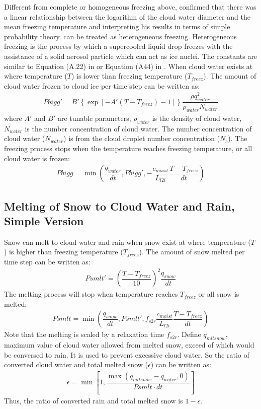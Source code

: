 \documentclass[letterpaper,titlepage,10pt]{article}
\numberwithin{equation}{section}
\begin{document}
Different from complete or homogeneous freezing above, \citet{bigg1953thes} confirmed that there was a linear relationship between the logarithm of the cloud water diameter and the mean freezing temperature and interpreting his results in terms of simple probability theory. \citet{bigg1953thes} can be treated as heterogeneous freezing. Heterogeneous freezing is the process by which a supercooled liquid drop freezes with the assistance of a solid aerosol particle which can act as ice nuclei. The constants are similar to Equation (A.22) in \citet{reisner1998expl} or Equation (A44) in \citet{hong2006thew}. When cloud water exists at where temperature ($T$) is lower than freezing temperature ($T_{freez}$). The amount of cloud water frozen to cloud ice per time step can be written as:
\begin{gather}
	Pbigg' = B' \left\{\exp \left[- A' \left( T - T_{freez}\right) - 1 \right] \right\} \dfrac{\rho q_{water}^2}{\rho_{water} N_{water}}
\end{gather}
where $A'$ and $B'$ are tunable parameters, $\rho_{water}$ is the density of cloud water, $N_{water}$ is the number concentration of cloud water. The number concentration of cloud water ($N_{water}$) is from the cloud droplet number concentration ($N_c$). The freezing process stops when the temperature reaches freezing temperature, or all cloud water is frozen:
\begin{gather}
	Pbigg = \min \left(\dfrac{q_{water}}{dt}, Pbigg', - \dfrac{c_{moist}}{L_{l2i}} \dfrac{T - T_{freez}}{dt} \right)
\end{gather}


\subsection{Melting of Snow to Cloud Water and Rain, Simple Version}

Snow can melt to cloud water and rain when snow exist at where temperature ($T$) is higher than freezing temperature ($T_{freez}$). The amount of snow melted per time step can be written as:
\begin{gather}
	Psmlt' = \left(\dfrac{T - T_{freez}}{10} \right)^2 \dfrac{q_{snow}}{dt}
\end{gather}
The melting process will stop when temperature reaches $T_{freez}$ or all snow is melted:
\begin{gather}
	Psmlt = \min \left(\dfrac{q_{snow}}{dt}, Psmlt', f_{s2r} \dfrac{c_{moist}}{L_{l2i}} \dfrac{T - T_{freez}}{dt} \right)
\end{gather}
Note that the melting is scaled by a relaxation time $f_{s2r}$. Define $q_{mltsnow}$, maximum value of cloud water allowed from melted snow, exceed of which would be conversed to rain. It is used to prevent excessive cloud water. So the ratio of converted cloud water and total melted snow ($\epsilon$) can be written as:
\begin{gather}
	\epsilon = \min \left[1, \dfrac{\max \left(q_{mltsnow} - q_{water}, 0 \right)}{Psmlt \cdot dt} \right]
\end{gather}
Thus, the ratio of converted rain and total melted snow is $1 - \epsilon$.
\end{document}
